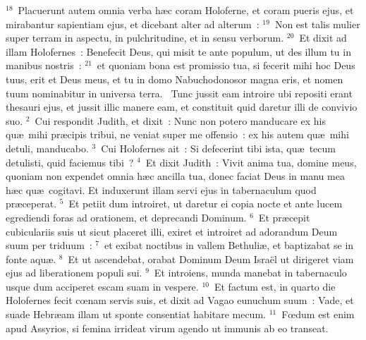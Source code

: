 ${}^{18}$~Placuerunt autem omnia verba h\ae c coram Holoferne, et coram pueris ejus, et mirabantur sapientiam ejus, et dicebant alter ad alterum~:
${}^{19}$~Non est talis mulier super terram in aspectu, in pulchritudine, et in sensu verborum.
${}^{20}$~Et dixit ad illam Holofernes~: Benefecit Deus, qui misit te ante populum, ut des illum tu in manibus nostris~:
${}^{21}$~et quoniam bona est promissio tua, si fecerit mihi hoc Deus tuus, erit et Deus meus, et tu in domo Nabuchodonosor magna eris, et nomen tuum nominabitur in universa terra.
~Tunc jussit eam introire ubi repositi erant thesauri ejus, et jussit illic manere eam, et constituit quid daretur illi de convivio suo.
${}^{2}$~Cui respondit Judith, et dixit~: Nunc non potero manducare ex his qu\ae\ mihi pr\ae cipis tribui, ne veniat super me offensio~: ex his autem qu\ae\ mihi detuli, manducabo.
${}^{3}$~Cui Holofernes ait~: Si defecerint tibi ista, qu\ae\ tecum detulisti, quid faciemus tibi~?
${}^{4}$~Et dixit Judith~: Vivit anima tua, domine meus, quoniam non expendet omnia h\ae c ancilla tua, donec faciat Deus in manu mea h\ae c qu\ae\ cogitavi. Et induxerunt illam servi ejus in tabernaculum quod pr\ae ceperat.
${}^{5}$~Et petiit dum introiret, ut daretur ei copia nocte et ante lucem egrediendi foras ad orationem, et deprecandi Dominum.
${}^{6}$~Et pr\ae cepit cubiculariis suis ut sicut placeret illi, exiret et introiret ad adorandum Deum suum per triduum~:
${}^{7}$~et exibat noctibus in vallem Bethuli\ae , et baptizabat se in fonte aqu\ae .
${}^{8}$~Et ut ascendebat, orabat Dominum Deum Isra\"el ut dirigeret viam ejus ad liberationem populi sui.
${}^{9}$~Et introiens, munda manebat in tabernaculo usque dum acciperet escam suam in vespere.
${}^{10}$~Et factum est, in quarto die Holofernes fecit cœnam servis suis, et dixit ad Vagao eunuchum suum~: Vade, et suade Hebr\ae am illam ut sponte consentiat habitare mecum.
${}^{11}$~Fœdum est enim apud Assyrios, si femina irrideat virum agendo ut immunis ab eo transeat.


